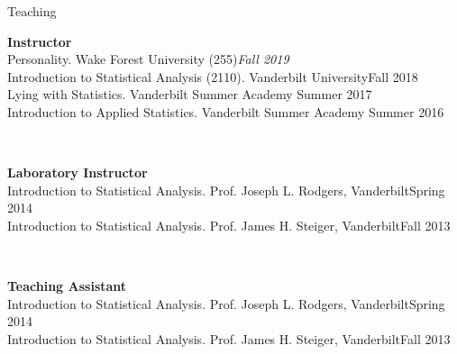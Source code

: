 \begin{rSection}{\textrm{Teaching}}
\vspace*{2pt}
\begin{minipage}{\linewidth}{\large {\bf Instructor}\\}
Personality. Wake Forest University (255)\hfill{\textit{Fall 2019}}\smallskip\\
Introduction to Statistical Analysis (2110). Vanderbilt University\hfill {Fall 2018}\smallskip\\
Lying with Statistics. Vanderbilt Summer Academy \hfill{Summer 2017}%
\smallskip\\
Introduction to Applied Statistics. Vanderbilt Summer Academy \hfill{Summer 2016}%
\end{minipage}
\smallskip\\
\begin{minipage}{\linewidth}{\large {\bf Laboratory Instructor}\\}
Introduction to Statistical Analysis. Prof. Joseph L. Rodgers, Vanderbilt\hfill  {Spring 2014}%
\smallskip\\
Introduction to Statistical Analysis. Prof. James H. Steiger, Vanderbilt\hfill  {Fall 2013}%
\end{minipage}
\medskip\\
\begin{minipage}{\linewidth}{\large {\bf Teaching Assistant}}\\
Introduction to Statistical Analysis. Prof. Joseph L. Rodgers, Vanderbilt\hfill  {Spring 2014}\smallskip\\
Introduction to Statistical Analysis. Prof. James H. Steiger, Vanderbilt\hfill  {Fall 2013}\smallskip\\

\end{minipage}
\end{rSection}

